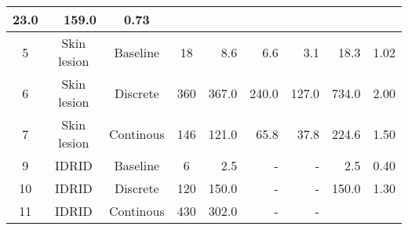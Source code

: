 \begin{table}[H]
{\begin{tabular}{ccccrrrrc}
    \multicolumn{1}{r|}{{\color[HTML]{000000} 23.0}} &
    \multicolumn{1}{r|}{{\color[HTML]{000000} 159.0}} &
    \multicolumn{1}{c|}{0.73} \\ \hline
  \multicolumn{1}{|c|}{5} &
    \multicolumn{1}{c|}{Skin lesion} &
    \multicolumn{1}{c|}{Baseline} &
    \multicolumn{1}{c|}{18} &
    \multicolumn{1}{r|}{{\color[HTML]{000000} 8.6}} &
    \multicolumn{1}{r|}{{\color[HTML]{000000} 6.6}} &
    \multicolumn{1}{r|}{{\color[HTML]{000000} 3.1}} &
    \multicolumn{1}{r|}{{\color[HTML]{000000} 18.3}} &
    \multicolumn{1}{c|}{1.02} \\ \hline
  \multicolumn{1}{|c|}{6} &
    \multicolumn{1}{c|}{Skin lesion} &
    \multicolumn{1}{c|}{Discrete} &
    \multicolumn{1}{c|}{360} &
    \multicolumn{1}{r|}{{\color[HTML]{000000} 367.0}} &
    \multicolumn{1}{r|}{{\color[HTML]{000000} 240.0}} &
    \multicolumn{1}{r|}{{\color[HTML]{000000} 127.0}} &
    \multicolumn{1}{r|}{{\color[HTML]{000000} 734.0}} &
    \multicolumn{1}{c|}{2.00} \\ \hline
  \multicolumn{1}{|c|}{7} &
    \multicolumn{1}{c|}{Skin lesion} &
    \multicolumn{1}{c|}{Continous} &
    \multicolumn{1}{c|}{146} &
    \multicolumn{1}{r|}{{\color[HTML]{000000} 121.0}} &
    \multicolumn{1}{r|}{{\color[HTML]{000000} 65.8}} &
    \multicolumn{1}{r|}{{\color[HTML]{000000} 37.8}} &
    \multicolumn{1}{r|}{{\color[HTML]{000000} 224.6}} &
    \multicolumn{1}{c|}{1.50} \\ \hline
  \multicolumn{1}{|c|}{9} &
    \multicolumn{1}{c|}{IDRID} &
    \multicolumn{1}{c|}{Baseline} &
    \multicolumn{1}{c|}{6} &
    \multicolumn{1}{r|}{{\color[HTML]{000000} 2.5}} &
    \multicolumn{1}{r|}{{\color[HTML]{000000} -}} &
    \multicolumn{1}{r|}{{\color[HTML]{000000} -}} &
    \multicolumn{1}{r|}{{\color[HTML]{000000} 2.5}} &
    \multicolumn{1}{c|}{0.40} \\ \hline
  \multicolumn{1}{|c|}{10} &
    \multicolumn{1}{c|}{IDRID} &
    \multicolumn{1}{c|}{Discrete} &
    \multicolumn{1}{c|}{120} &
    \multicolumn{1}{r|}{{\color[HTML]{000000} 150.0}} &
    \multicolumn{1}{r|}{{\color[HTML]{000000} -}} &
    \multicolumn{1}{r|}{{\color[HTML]{000000} -}} &
    \multicolumn{1}{r|}{{\color[HTML]{000000} 150.0}} &
    \multicolumn{1}{c|}{1.30} \\ \hline
  \multicolumn{1}{|c|}{11} &
    \multicolumn{1}{c|}{IDRID} &
    \multicolumn{1}{c|}{Continous} &
    \multicolumn{1}{c|}{430} &
    \multicolumn{1}{r|}{{\color[HTML]{000000} 302.0}} &
    \multicolumn{1}{r|}{{\color[HTML]{000000} -}} &
    \multicolumn{1}{r|}{{\color[HTML]{000000} -}} &

\end{tabular}}
\end{table}
